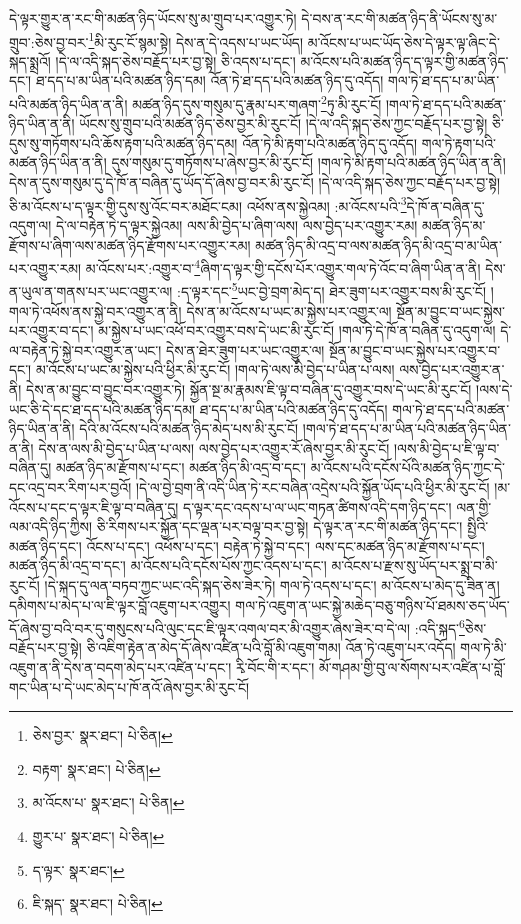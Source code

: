 དེ་ལྟར་གྱུར་ན་རང་གི་མཚན་ཉིད་ཡོངས་སུ་མ་གྲུབ་པར་འགྱུར་ཏེ། དེ་བས་ན་རང་གི་མཚན་ཉིད་ནི་ཡོངས་སུ་མ་གྲུབ་:ཅེས་བྱ་བར་\footnote{ཅེས་བྱར་  སྣར་ཐང་།  པེ་ཅིན། }མི་རུང་ངོ་སྙམ་སྟེ། དེས་ན་དེ་འདས་པ་ཡང་ཡོད། མ་འོངས་པ་ཡང་ཡོད་ཅེས་དེ་ལྟར་ལྟ་ཞིང་དེ་སྐད་སྨྲའོ། །དེ་ལ་འདི་སྐད་ཅེས་བརྗོད་པར་བྱ་སྟེ། ཅི་འདས་པ་དང་། མ་འོངས་པའི་མཚན་ཉིད་ད་ལྟར་གྱི་མཚན་ཉིད་དང་། ཐ་དད་པ་མ་ཡིན་པའི་མཚན་ཉིད་དམ། འོན་ཏེ་ཐ་དད་པའི་མཚན་ཉིད་དུ་འདོད། གལ་ཏེ་ཐ་དད་པ་མ་ཡིན་པའི་མཚན་ཉིད་ཡིན་ན་ནི། མཚན་ཉིད་དུས་གསུམ་དུ་རྣམ་པར་གཞག་\footnote{བརྟག་  སྣར་ཐང་།  པེ་ཅིན། }ཏུ་མི་རུང་ངོ། །གལ་ཏེ་ཐ་དད་པའི་མཚན་ཉིད་ཡིན་ན་ནི། ཡོངས་སུ་གྲུབ་པའི་མཚན་ཉིད་ཅེས་བྱར་མི་རུང་ངོ། །དེ་ལ་འདི་སྐད་ཅེས་ཀྱང་བརྗོད་པར་བྱ་སྟེ། ཅི་དུས་སུ་གཏོགས་པའི་ཆོས་རྟག་པའི་མཚན་ཉིད་དམ། འོན་ཏེ་མི་རྟག་པའི་མཚན་ཉིད་དུ་འདོད། གལ་ཏེ་རྟག་པའི་མཚན་ཉིད་ཡིན་ན་ནི། དུས་གསུམ་དུ་གཏོགས་པ་ཞེས་བྱར་མི་རུང་ངོ། །གལ་ཏེ་མི་རྟག་པའི་མཚན་ཉིད་ཡིན་ན་ནི། དེས་ན་དུས་གསུམ་དུ་དེ་ཁོ་ན་བཞིན་དུ་ཡོད་དོ་ཞེས་བྱ་བར་མི་རུང་ངོ། །དེ་ལ་འདི་སྐད་ཅེས་ཀྱང་བརྗོད་པར་བྱ་སྟེ། ཅི་མ་འོངས་པ་ད་ལྟར་གྱི་དུས་སུ་འོང་བར་མཐོང་ངམ། འཕོས་ནས་སྐྱེའམ། :མ་འོངས་པའི་\footnote{མ་འོངས་པ་  སྣར་ཐང་།  པེ་ཅིན། }དེ་ཁོ་ན་བཞིན་དུ་འདུག་ལ། དེ་ལ་བརྟེན་ཏེ་ད་ལྟར་སྐྱེའམ། ལས་མི་བྱེད་པ་ཞིག་ལས། ལས་བྱེད་པར་འགྱུར་རམ། མཚན་ཉིད་མ་རྫོགས་པ་ཞིག་ལས་མཚན་ཉིད་རྫོགས་པར་འགྱུར་རམ། མཚན་ཉིད་མི་འདྲ་བ་ལས་མཚན་ཉིད་མི་འདྲ་བ་མ་ཡིན་པར་འགྱུར་རམ། མ་འོངས་པར་:འགྱུར་བ་\footnote{གྱུར་པ་  སྣར་ཐང་།  པེ་ཅིན། }ཞིག་ད་ལྟར་གྱི་དངོས་པོར་འགྱུར་གལ་ཏེ་འོང་བ་ཞིག་ཡིན་ན་ནི། དེས་ན་ཡུལ་ན་གནས་པར་ཡང་འགྱུར་ལ། :ད་ལྟར་དང་\footnote{ད་ལྟར་  སྣར་ཐང་། }ཡང་བྱེ་བྲག་མེད་ད། ཐེར་ཟུག་པར་འགྱུར་བས་མི་རུང་ངོ། །གལ་ཏེ་འཕོས་ནས་སྐྱེ་བར་འགྱུར་ན་ནི། དེས་ན་མ་འོངས་པ་ཡང་མ་སྐྱེས་པར་འགྱུར་ལ། སྔོན་མ་བྱུང་བ་ཡང་སྐྱེས་པར་འགྱུར་བ་དང་། མ་སྐྱེས་པ་ཡང་འཕོ་བར་འགྱུར་བས་དེ་ཡང་མི་རུང་ངོ། །གལ་ཏེ་དེ་ཁོ་ན་བཞིན་དུ་འདུག་ལ། དེ་ལ་བརྟེན་ཏེ་སྐྱེ་བར་འགྱུར་ན་ཡང་། དེས་ན་ཐེར་ཟུག་པར་ཡང་འགྱུར་ལ། སྔོན་མ་བྱུང་བ་ཡང་སྐྱེས་པར་འགྱུར་བ་དང་། མ་འོངས་པ་ཡང་མ་སྐྱེས་པའི་ཕྱིར་མི་རུང་ངོ། །གལ་ཏེ་ལས་མི་བྱེད་པ་ཡིན་པ་ལས། ལས་བྱེད་པར་འགྱུར་ན་ནི། དེས་ན་མ་བྱུང་བ་བྱུང་བར་འགྱུར་ཏེ། སྐྱོན་སྔ་མ་རྣམས་ཇི་ལྟ་བ་བཞིན་དུ་འགྱུར་བས་དེ་ཡང་མི་རུང་ངོ། །ལས་དེ་ཡང་ཅི་དེ་དང་ཐ་དད་པའི་མཚན་ཉིད་དམ། ཐ་དད་པ་མ་ཡིན་པའི་མཚན་ཉིད་དུ་འདོད། གལ་ཏེ་ཐ་དད་པའི་མཚན་ཉིད་ཡིན་ན་ནི། དེའི་མ་འོངས་པའི་མཚན་ཉིད་མེད་པས་མི་རུང་ངོ། །གལ་ཏེ་ཐ་དད་པ་མ་ཡིན་པའི་མཚན་ཉིད་ཡིན་ན་ནི། དེས་ན་ལས་མི་བྱེད་པ་ཡིན་པ་ལས། ལས་བྱེད་པར་འགྱུར་རོ་ཞེས་བྱར་མི་རུང་ངོ། །ལས་མི་བྱེད་པ་ཇི་ལྟ་བ་བཞིན་དུ། མཚན་ཉིད་མ་རྫོགས་པ་དང་། མཚན་ཉིད་མི་འདྲ་བ་དང་། མ་འོངས་པའི་དངོས་པོའི་མཚན་ཉིད་ཀྱང་དེ་དང་འདྲ་བར་རིག་པར་བྱའོ། །དེ་ལ་བྱེ་བྲག་ནི་འདི་ཡིན་ཏེ་རང་བཞིན་འདྲེས་པའི་སྐྱོན་ཡོད་པའི་ཕྱིར་མི་རུང་ངོ། །མ་འོངས་པ་དང་ད་ལྟར་ཇི་ལྟ་བ་བཞིན་དུ། ད་ལྟར་དང་འདས་པ་ལ་ཡང་གཏན་ཚིགས་འདི་དག་ཉིད་དང་། ལན་གྱི་ལམ་འདི་ཉིད་ཀྱིས། ཅི་རིགས་པར་སྐྱོན་དང་ལྡན་པར་བལྟ་བར་བྱ་སྟེ། དེ་ལྟར་ན་རང་གི་མཚན་ཉིད་དང་། སྤྱིའི་མཚན་ཉིད་དང་། འོངས་པ་དང་། འཕོས་པ་དང་། བརྟེན་ཏེ་སྐྱེ་བ་དང་། ལས་དང་མཚན་ཉིད་མ་རྫོགས་པ་དང་། མཚན་ཉིད་མི་འདྲ་བ་དང་། མ་འོངས་པའི་དངོས་པོས་ཀྱང་འདས་པ་དང་། མ་འོངས་པ་རྫས་སུ་ཡོད་པར་སྨྲ་བ་མི་རུང་ངོ། །དེ་སྐད་དུ་ལན་བཏབ་ཀྱང་ཡང་འདི་སྐད་ཅེས་ཟེར་ཏེ། གལ་ཏེ་འདས་པ་དང་། མ་འོངས་པ་མེད་དུ་ཟིན་ན། དམིགས་པ་མེད་པ་ལ་ཇི་ལྟར་བློ་འཇུག་པར་འགྱུར། གལ་ཏེ་འཇུག་ན་ཡང་སྐྱེ་མཆེད་བཅུ་གཉིས་པོ་ཐམས་ཅད་ཡོད་དོ་ཞེས་བྱ་བའི་བར་དུ་གསུངས་པའི་ལུང་དང་ཇི་ལྟར་འགལ་བར་མི་འགྱུར་ཞེས་ཟེར་བ་དེ་ལ། :འདི་སྐད་\footnote{ཇི་སྐད་  སྣར་ཐང་།  པེ་ཅིན། }ཅེས་བརྗོད་པར་བྱ་སྟེ། ཅི་འཇིག་རྟེན་ན་མེད་དོ་ཞེས་འཛིན་པའི་བློ་མི་འཇུག་གམ། འོན་ཏེ་འཇུག་པར་འདོད། གལ་ཏེ་མི་འཇུག་ན་ནི་དེས་ན་བདག་མེད་པར་འཛིན་པ་དང་། རྭི་བོང་གི་ར་དང་། མོ་གཤམ་གྱི་བུ་ལ་སོགས་པར་འཛིན་པ་བློ་གང་ཡིན་པ་དེ་ཡང་མེད་པ་ཁོ་ནའོ་ཞེས་བྱར་མི་རུང་ངོ། 